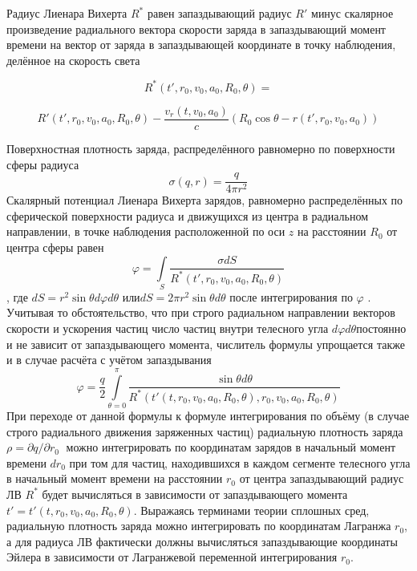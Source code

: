 ﻿\documentclass{article}
\begin{document}
Радиус Лиенара Вихерта ${{R}^{*}}$ равен запаздывающий радиус $R'$ минус скалярное произведение радиального вектора скорости заряда в запаздывающий момент времени на вектор от заряда в запаздывающей координате в точку наблюдения, делённое на скорость света

	\[{{R}^{*}}\left( t',{{r}_{0}},{{v}_{0}},{{a}_{0}},{{R}_{0}},\theta  \right) = \]

\[R'\left( t',{{r}_{0}},{{v}_{0}},{{a}_{0}},{{R}_{0}},\theta  \right) - \frac{{{v}_{r}}\left( t,{{v}_{0}},{{a}_{0}} \right)}{c}\left( {{R}_{0}}\cos \theta - r\left( t',{{r}_{0}},{{v}_{0}},{{a}_{0}} \right) \right)\]
	
Поверхностная плотность заряда, распределённого равномерно по поверхности сферы радиуса
	\[\sigma \left( q,r \right)=\frac{q}{4\pi {{r}^{2}}}\] 	
Скалярный потенциал Лиенара Вихерта зарядов, равномерно распределённых по сферической поверхности радиуса  и движущихся из центра в радиальном направлении, в точке наблюдения расположенной по оси $z$  на расстоянии ${{R}_{0}}$ от центра сферы равен \[\varphi =\int\limits_{S}{\frac{\sigma dS}{{{R}^{*}}\left( t',{{r}_{0}},{{v}_{0}},{{a}_{0}},{{R}_{0}},\theta  \right)}}\], где $dS={{r}^{2}}\sin \theta d\varphi d\theta $  или$dS=2\pi {{r}^{2}}\sin \theta d\theta $ после интегрирования по $\varphi $ . Учитывая то обстоятельство, что при строго радиальном направлении векторов скорости и ускорения частиц число частиц внутри телесного угла $d\varphi d\theta $постоянно и не зависит от запаздывающего момента, числитель формулы упрощается также и в случае расчёта с учётом запаздывания
	\[\varphi =\frac{q}{2}\int\limits_{\theta =0}^{\pi }{\frac{\sin \theta d\theta }{{{R}^{*}}\left( t'\left( t,{{r}_{0}},{{v}_{0}},{{a}_{0}},{{R}_{0}},\theta  \right),{{r}_{0}},{{v}_{0}},{{a}_{0}},{{R}_{0}},\theta  \right)}}\] 	
При переходе от данной формулы к формуле интегрирования по объёму (в случае строго радиального движения заряженных частиц) радиальную плотность заряда ${\rho =\partial q}/{\partial {{r}_{0}}}\;$ можно интегрировать по координатам зарядов в начальный момент времени $d{{r}_{0}}$ при том для частиц, находившихся в каждом сегменте телесного угла в начальный момент времени на расстоянии ${{r}_{0}}$ от центра запаздывающий радиус ЛВ ${{R}^{*}}$ будет вычисляться в зависимости от запаздывающего момента $t'=t'\left( t,{{r}_{0}},{{v}_{0}},{{a}_{0}},{{R}_{0}},\theta  \right)$. Выражаясь терминами теории сплошных сред, радиальную плотность заряда можно интегрировать по координатам Лагранжа ${{r}_{0}}$, а для радиуса ЛВ фактически должны вычисляться запаздывающие координаты Эйлера в зависимости от Лагранжевой переменной интегрирования ${{r}_{0}}$.
\end{document}
